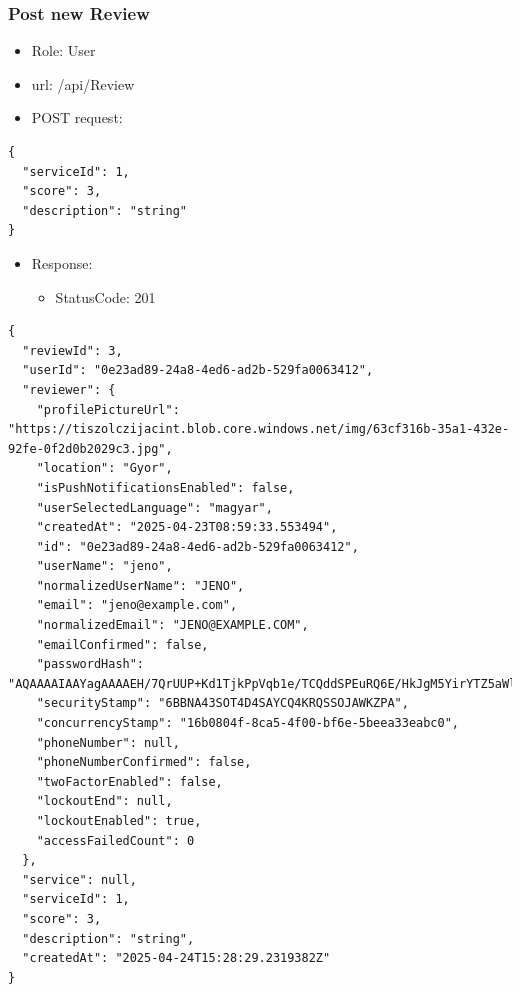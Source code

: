 \documentclass[11pt]{article}
\begin{document}
\subsubsection{Post new Review}
\label{sec:org83d85a7}
\begin{itemize}
\item Role: User
\item url: /api/Review
\item POST request:
\end{itemize}
\begin{verbatim}
{
  "serviceId": 1,
  "score": 3,
  "description": "string"
}
\end{verbatim}
\begin{itemize}
\item Response:
\begin{itemize}
\item StatusCode: 201
\end{itemize}
\end{itemize}
\begin{verbatim}
{
  "reviewId": 3,
  "userId": "0e23ad89-24a8-4ed6-ad2b-529fa0063412",
  "reviewer": {
    "profilePictureUrl": "https://tiszolczijacint.blob.core.windows.net/img/63cf316b-35a1-432e-92fe-0f2d0b2029c3.jpg",
    "location": "Gyor",
    "isPushNotificationsEnabled": false,
    "userSelectedLanguage": "magyar",
    "createdAt": "2025-04-23T08:59:33.553494",
    "id": "0e23ad89-24a8-4ed6-ad2b-529fa0063412",
    "userName": "jeno",
    "normalizedUserName": "JENO",
    "email": "jeno@example.com",
    "normalizedEmail": "JENO@EXAMPLE.COM",
    "emailConfirmed": false,
    "passwordHash": "AQAAAAIAAYagAAAAEH/7QrUUP+Kd1TjkPpVqb1e/TCQddSPEuRQ6E/HkJgM5YirYTZ5aWl5VpLLPzyJ/ZQ==",
    "securityStamp": "6BBNA43SOT4D4SAYCQ4KRQSSOJAWKZPA",
    "concurrencyStamp": "16b0804f-8ca5-4f00-bf6e-5beea33eabc0",
    "phoneNumber": null,
    "phoneNumberConfirmed": false,
    "twoFactorEnabled": false,
    "lockoutEnd": null,
    "lockoutEnabled": true,
    "accessFailedCount": 0
  },
  "service": null,
  "serviceId": 1,
  "score": 3,
  "description": "string",
  "createdAt": "2025-04-24T15:28:29.2319382Z"
}
\end{verbatim}
\end{document}
